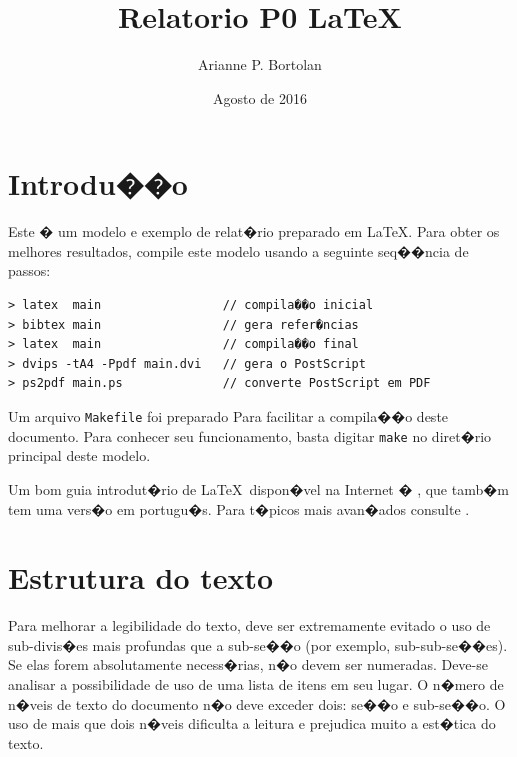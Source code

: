 \documentclass [12pt,oneside] {article}
\begin{document}
\title {Relatorio P0 \LaTeX}
\author {Arianne P. Bortolan}
\date {Agosto de 2016}
\maketitle


\section{Introdu��o}

Este � um modelo e exemplo de relat�rio preparado em \LaTeX. Para obter os melhores resultados, compile este modelo usando a seguinte seq��ncia de passos:

\begin{footnotesize}
\begin{verbatim}
> latex  main                 // compila��o inicial
> bibtex main                 // gera refer�ncias
> latex  main                 // compila��o final
> dvips -tA4 -Ppdf main.dvi   // gera o PostScript
> ps2pdf main.ps              // converte PostScript em PDF
\end{verbatim}
\end{footnotesize}

Um arquivo \texttt{Makefile} foi preparado Para facilitar a compila��o deste documento. Para conhecer seu funcionamento, basta digitar \texttt{make} no diret�rio principal deste modelo.

Um bom guia introdut�rio de \LaTeX\ dispon�vel na Internet � \cite{oetiker07}, que tamb�m tem uma vers�o em portugu�s. Para t�picos mais avan�ados consulte \cite{goossens93}.


\section{Estrutura do texto}

Para melhorar a legibilidade do texto, deve ser extremamente evitado o uso de sub-divis�es mais profundas que a sub-se��o (por exemplo, sub-sub-se��es). Se elas forem absolutamente necess�rias, n�o devem ser numeradas. Deve-se analisar a possibilidade de uso de uma lista de itens em seu lugar. O n�mero de n�veis de texto do documento n�o deve exceder dois: se��o e sub-se��o. O uso de mais que dois n�veis dificulta a leitura e prejudica muito a est�tica do texto.
\end{document}
